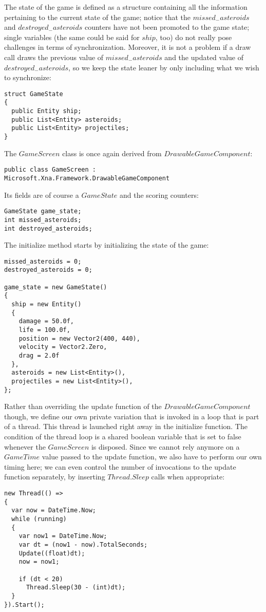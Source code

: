 The state of the game is defined as a structure containing all the information pertaining to the current state of the game; notice that the $missed_{-}asteroids$ and $destroyed_{-}asteroids$ counters have not been promoted to the game state; single variables (the same could be said for $ship$, too) do not really pose challenges in terms of synchronization. Moreover, it is not a problem if a draw call draws the previous value of $missed_{-}asteroids$ and the updated value of $destroyed_{-}asteroids$, so we keep the state leaner by only including what we wish to synchronize:
\begin{lstlisting}
struct GameState
{
  public Entity ship;
  public List<Entity> asteroids;
  public List<Entity> projectiles;
}
\end{lstlisting}

The $GameScreen$ class is once again derived from $DrawableGameComponent$:
\begin{lstlisting}
public class GameScreen : Microsoft.Xna.Framework.DrawableGameComponent
\end{lstlisting}

Its fields are of course a $GameState$ and the scoring counters:
\begin{lstlisting}
GameState game_state;
int missed_asteroids;
int destroyed_asteroids;
\end{lstlisting}

The initialize method starts by initializing the state of the game:
\begin{lstlisting}
missed_asteroids = 0;
destroyed_asteroids = 0;

game_state = new GameState()
{
  ship = new Entity()
  {
    damage = 50.0f,
    life = 100.0f,
    position = new Vector2(400, 440),
    velocity = Vector2.Zero,
    drag = 2.0f
  },
  asteroids = new List<Entity>(),
  projectiles = new List<Entity>(),
};
\end{lstlisting}

Rather than overriding the update function of the $DrawableGameComponent$ though, we define our own private variation that is invoked in a loop that is part of a thread. This thread is launched right away in the initialize function. The condition of the thread loop is a shared boolean variable that is set to false whenever the $GameScreen$ is disposed. Since we cannot rely anymore on a $GameTime$ value passed to the update function, we also have to perform our own timing here; we can even control the number of invocations to the update function separately, by inserting $Thread.Sleep$ calls when appropriate:
\begin{lstlisting}
new Thread(() =>
{
  var now = DateTime.Now;
  while (running)
  {
    var now1 = DateTime.Now;
    var dt = (now1 - now).TotalSeconds;
    Update((float)dt);
    now = now1;

    if (dt < 20)
      Thread.Sleep(30 - (int)dt);
  }
}).Start();
\end{lstlisting}

